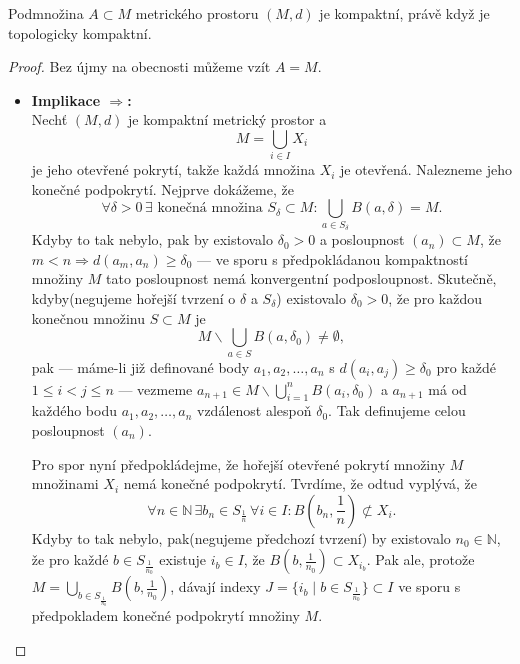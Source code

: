 \documentclass[../main.tex]{subfiles}
\begin{document}
\begin{theorem}
    Podmnožina $A\subset M$ metrického prostoru $(M,d)$ je kompaktní, právě když je topologicky kompaktní.
\end{theorem}
\begin{proof}
    Bez újmy na obecnosti můžeme vzít $A = M$.
    \begin{itemize}
        \item {
            \textbf{Implikace $\Rightarrow$:}\\
            Nechť $(M,d)$ je kompaktní metrický prostor a \[ M = \bigcup_{i\in I} X_i \]
            je jeho otevřené pokrytí, takže každá množina $X_i$ je otevřená.
            Nalezneme jeho konečné podpokrytí. Nejprve dokážeme, že
            \[ \forall \delta > 0 \, \exists \,\, \text{konečná množina} \,\, S_{\delta} \subset M: \bigcup_{a\in S_{\delta}} B(a,\delta) = M. \]
            Kdyby to tak nebylo, pak by existovalo $\delta_0 > 0$ a posloupnost $(a_n) \subset M$, že $m < n \Rightarrow d(a_m,a_n) \geq \delta_0$
            --- ve sporu s předpokládanou kompaktností množiny $M$ tato posloupnost nemá konvergentní podposloupnost.
            Skutečně, kdyby(negujeme hořejší tvrzení o $\delta$ a $S_\delta$) existovalo $\delta_0 > 0$, že pro každou konečnou
            množinu $S\subset M$ je
            \[ M \backslash \bigcup_{a\in S} B(a,\delta_0) \neq \emptyset, \]
            pak --- máme-li již definované body $a_1,a_2,\dots,a_n$ s $d(a_i, a_j) \geq \delta_0$ pro každé
            $1 \leq i < j \leq n$ --- vezmeme $a_{n+1} \in M\backslash \bigcup_{i=1}^{n} B(a_i, \delta_0)$
            a $a_{n+1}$ má od každého bodu $a_1,a_2,\dots, a_n$ vzdálenost alespoň $\delta_0$.
            Tak definujeme celou posloupnost $(a_n)$.

            Pro spor nyní předpokládejme, že hořejší otevřené pokrytí množiny $M$ množinami $X_i$ nemá konečné podpokrytí.
            Tvrdíme, že odtud vyplývá, že \[ \forall n \in\mathbb{N} \, \exists b_n \in S_{\frac{1}{n}} \, \forall i \in I: B\left(b_n, \frac{1}{n}\right) \not\subset X_i. \]
            Kdyby to tak nebylo, pak(negujeme předchozí tvrzení) by existovalo $n_0 \in\mathbb{N}$, že pro každé $b\in S_{\frac{1}{n_0}}$ existuje $i_b \in I$, že
            $B\left(b,\frac{1}{n_0} \right) \subset X_{i_b}$. Pak ale, protože $M = \bigcup_{b\in S_{\frac{1}{n_0}}} B\left( b, \frac{1}{n_0} \right)$, dávají
            indexy $J = \{ i_b \mid b\in S_{\frac{1}{n_0}} \} \subset I$ ve sporu s předpokladem konečné podpokrytí množiny $M$.

}
\end{itemize}
\end{proof}
\end{document}
